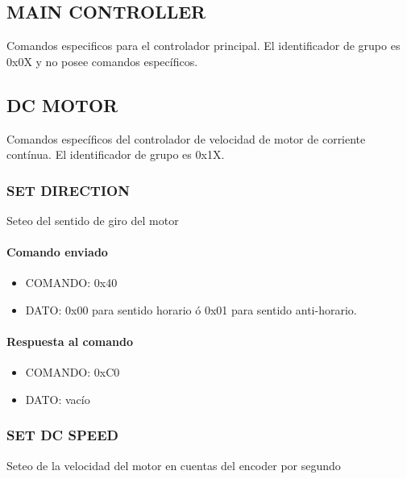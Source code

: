\subsection{MAIN CONTROLLER}
\label{hA_protocolo_grupo_main_controller}

Comandos especificos para el controlador principal.
El identificador de grupo es 0x0X y no posee comandos espec\'ificos.

\subsection{DC MOTOR}
\label{hA_protocolo_grupo_dc_motor}

Comandos espec\'ificos del controlador de velocidad de motor de corriente cont\'inua.
El identificador de grupo es 0x1X.

\subsubsection{SET DIRECTION}
\label{hA_protocolo_set_direction}

Seteo del sentido de giro del motor

\paragraph*{Comando enviado}

\begin{itemize}
	\item{COMANDO:} 0x40
	\item{DATO:} 0x00 para sentido horario \'o 0x01 para sentido anti-horario.
\end{itemize}

\paragraph*{Respuesta al comando}

\begin{itemize}
	\item{COMANDO:} 0xC0
	\item{DATO:} vac\'io
\end{itemize}

\subsubsection{SET DC SPEED}
\label{hA_protocolo_set_dc_speed}

Seteo de la velocidad del motor en cuentas del encoder por segundo

